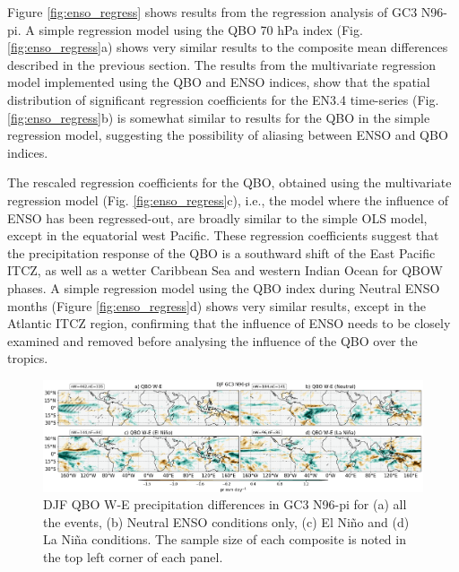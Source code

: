 Figure \ref{fig:enso_regress} shows results from the regression analysis of GC3 N96-pi. 
A simple regression model using the QBO 70 hPa index (Fig. \ref{fig:enso_regress}a) shows very similar results to the composite mean differences described in the previous section.
The results from the multivariate regression model implemented using the QBO and ENSO indices, show that the spatial distribution of significant regression coefficients for the EN3.4 time-series (Fig. \ref{fig:enso_regress}b) is somewhat similar to results for the QBO in the simple regression model, suggesting the possibility of aliasing between ENSO and QBO indices. 

 The rescaled regression coefficients for the QBO, obtained using the multivariate regression model (Fig. \ref{fig:enso_regress}c), i.e., the model where the influence of ENSO has been regressed-out, are broadly similar to the simple OLS model, except in the equatorial west Pacific. These regression coefficients suggest that the precipitation response of the QBO is a southward shift of the East Pacific ITCZ, as well as a wetter Caribbean Sea and western Indian Ocean for QBOW phases.
 A simple regression model using the QBO index during Neutral ENSO months (Figure \ref{fig:enso_regress}d) shows very similar results, except in the Atlantic ITCZ region, confirming that the influence of ENSO needs to be closely examined and removed before analysing the influence of the QBO over the tropics. 
 
 \begin{figure}[b!]
\centering
 \includegraphics[width=\linewidth]{figures/ensoqboprdjf.png}
\caption[Precipitation response to QBO W-E for GC3 N96-pi under different QBO phases.]{ DJF QBO W-E precipitation differences in GC3 N96-pi for (a) all the events, (b) Neutral ENSO conditions only, (c) El Niño and (d) La Niña conditions. The sample size of each composite is noted in the top left corner of each panel. }
\label{fig:qboenso}
\end{figure}



